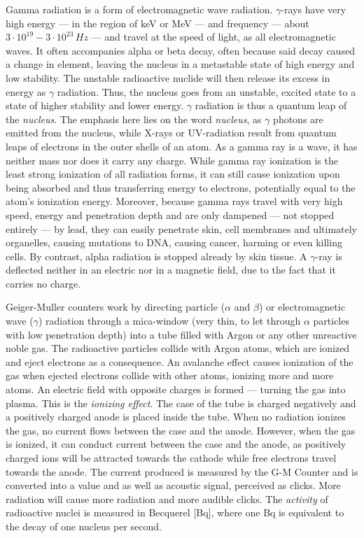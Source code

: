 Gamma radiation is a form of electromagnetic wave radiation. $\gamma$-rays have very high energy --- in the region of keV or MeV --- and frequency --- about $3 \cdot 10^{19} - 3 \cdot 10^{23}\, Hz$ --- and travel at the speed of light, as all electromagnetic waves. It often accompanies alpha or beta decay, often because said decay caused a change in element, leaving the nucleus in a metastable state of high energy and low stability. The unstable radioactive nuclide will then release its excess in energy as $\gamma$ radiation. Thus, the nucleus goes from an unstable, excited state to a state of higher stability and lower energy. $\gamma$ radiation is thus a quantum leap of the \emph{nucleus}. The emphasis here lies on the word \emph{nucleus}, as $\gamma$ photons are emitted from the nucleus, while X-rays or UV-radiation result from quantum leaps of electrons in the outer shells of an atom. As a gamma ray is a wave, it has neither mass nor does it carry any charge. While gamma ray ionization is the least strong ionization of all radiation forms, it can still cause ionization upon being absorbed and thus transferring energy to electrons, potentially equal to the atom's ionization energy. Moreover, because gamma rays travel with very high speed, energy and penetration depth and are only dampened --- not stopped entirely --- by lead, they can easily penetrate skin, cell membranes and ultimately organelles, causing mutations to DNA, causing cancer, harming or even killing cells. By contrast, alpha radiation is stopped already by skin tissue. A $\gamma$-ray is deflected neither in an electric nor in a magnetic field, due to the fact that it carries no charge.


Geiger-Muller counters work by directing particle ($\alpha$ and $\beta$) or electromagnetic wave ($\gamma$) radiation through a mica-window (very thin, to let through $\alpha$ particles with low penetration depth) into a tube filled with Argon or any other unreactive noble gas. The radioactive particles collide with Argon atoms, which are ionized and eject electrons as a consequence. An avalanche effect causes ionization of the gas when ejected electrons collide with other atoms, ionizing more and more atoms. An electric field with opposite charges is formed --- turning the gas into plasma. This is the \emph{ionizing effect}. The case of the tube is charged negatively and a positively charged anode is placed inside the tube. When no radiation ionizes the gas, no current flows between the case and the anode. However, when the gas is ionized, it can conduct current between the case and the anode, as positively charged ions will be attracted towards the cathode while free electrons travel towards the anode. The current produced is measured by the G-M Counter and is converted into a value and as well as acoustic signal, perceived as clicks. More radiation will cause more radiation and more audible clicks. The \emph{activity} of radioactive nuclei is measured in Becquerel [Bq], where one Bq is equivalent to the decay of one nucleus per second.

